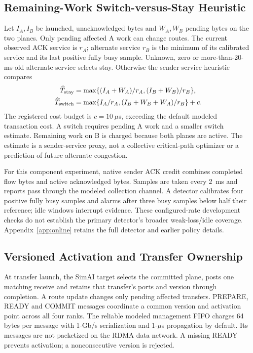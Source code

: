 \documentclass[sigconf]{acmart}
\begin{document}
\subsection{Remaining-Work Switch-versus-Stay Heuristic}
Let $I_A,I_B$ be launched, unacknowledged bytes and $W_A,W_B$ pending
bytes on the two planes. Only pending affected A work can change routes.
The current observed ACK service is $r_A$; alternate service $r_B$ is the
minimum of its calibrated service and its last positive fully busy sample.
Unknown, zero or more-than-20-ms-old alternate service selects stay.
Otherwise the sender-service heuristic compares
\begin{align*}
\widehat T_{\rm stay}&=\max\{(I_A+W_A)/r_A,(I_B+W_B)/r_B\},\\
\widehat T_{\rm switch}&=\max\{I_A/r_A,(I_B+W_B+W_A)/r_B\}+c.
\end{align*}
The registered cost budget is $c=10~\mu$s, exceeding the default modeled
transaction cost. A switch requires pending A work and a smaller switch
estimate. Remaining work on B is charged because both planes are active.
The estimate is a sender-service proxy, not a collective critical-path
optimizer or a prediction of future alternate congestion.

For this component experiment, native sender ACK credit combines completed
flow bytes and active acknowledged bytes. Samples are taken every 2~ms and
reports pass through the modeled collection channel. A detector calibrates four positive fully
busy samples and alarms after three busy samples below half their reference;
idle windows interrupt evidence. These configured-rate development checks
do not establish the primary detector's broader weak-loss/idle coverage.
Appendix~\ref{app:online} retains the full detector and earlier policy details.

\subsection{Versioned Activation and Transfer Ownership}
At transfer launch, the SimAI target selects the committed plane, posts
one matching receive and retains that transfer's ports and version through
completion. A route update changes only pending affected transfers.
PREPARE, READY and COMMIT messages coordinate a common version and
activation point across all four ranks. The reliable modeled management
FIFO charges 64 bytes per message with 1-Gb/s serialization and 1-$\mu$s
propagation by default. Its messages are not packetized on the RDMA data
network. A missing READY prevents activation; a nonconsecutive version is
rejected.
\end{document}
